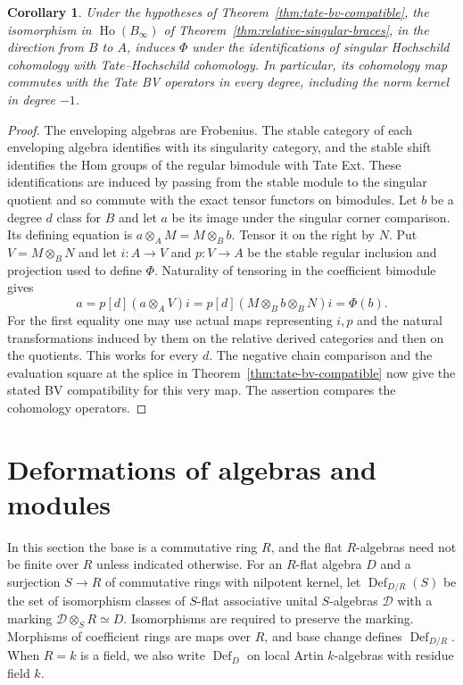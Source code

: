 \documentclass[12pt,a4paper,english,reqno]{amsart}
\numberwithin{equation}{section}
\theoremstyle{plain}
\newtheorem{corollary}[theorem]{Corollary}
\theoremstyle{definition}
\begin{document}
\begin{corollary}\label{cor:singular-braces-bv}
Under the hypotheses of Theorem~\ref{thm:tate-bv-compatible},
the isomorphism in $\operatorname{Ho}(B_\infty)$ of
Theorem~\ref{thm:relative-singular-braces}, in the direction from
$B$ to $A$, induces $\Phi$ under the identifications of singular
Hochschild cohomology with Tate--Hochschild cohomology. In
particular, its cohomology map commutes with the Tate BV
operators in every degree, including the norm kernel in degree
$-1$.
\end{corollary}

\begin{proof}
The enveloping algebras are Frobenius. The stable category of
each enveloping algebra identifies with its singularity category,
and the stable shift identifies the Hom groups of the regular
bimodule with Tate Ext. These identifications are induced by
passing from the stable module to the singular quotient and so
commute with the exact tensor functors on bimodules. Let $b$ be
a degree $d$ class for $B$ and let $a$ be its image under the
singular corner comparison. Its defining equation is
$a\otimes_A M=M\otimes_B b$. Tensor it on the right by $N$.
Put $V=M\otimes_B N$ and let $i:A\to V$ and $p:V\to A$
be the stable regular inclusion and projection used to define
$\Phi$. Naturality of tensoring in the coefficient bimodule
gives
\[
 a=p[d](a\otimes_A V)i
   =p[d](M\otimes_B b\otimes_B N)i=\Phi(b).
\]
For the first equality one may use actual maps representing
$i,p$ and the natural transformations induced by them on the
relative derived categories and then on the quotients. This
works for every $d$. The negative chain comparison and the
evaluation square at the splice in
Theorem~\ref{thm:tate-bv-compatible} now give the stated BV
compatibility for this very map. The assertion compares the
cohomology operators.
\end{proof}

\section{Deformations of algebras and modules}
\label{sec:associative-deformations}

In this section the base is a commutative ring $R$, and the
flat $R$-algebras need not be finite over $R$ unless indicated otherwise.
For an $R$-flat algebra $D$ and a surjection $S\to R$ of commutative rings with nilpotent
kernel, let $\operatorname{Def}_{D/R}(S)$ be the set of isomorphism
classes of $S$-flat associative unital $S$-algebras $\mathcal D$
with a marking $\mathcal D\otimes_S R\simeq D$. Isomorphisms
are required to preserve the marking. Morphisms of coefficient
rings are maps over $R$, and base change defines
$\operatorname{Def}_{D/R}$. When $R=k$ is a field, we also write
$\operatorname{Def}_D$ on local Artin $k$-algebras with residue field $k$.
\end{document}
